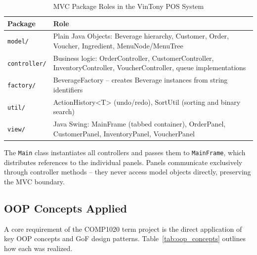 \documentclass[11pt,a4paper]{article}
\begin{document}
\begin{table}[H]
\centering
\caption{MVC Package Roles in the VinTony POS System}
\label{tab:mvc_packages}
\begin{tabular}{lp{10cm}}
\toprule
\textbf{Package} & \textbf{Role} \\
\midrule
\texttt{model/} & Plain Java Objects: Beverage hierarchy, Customer, Order, Voucher, Ingredient, MenuNode/MenuTree \\
\texttt{controller/} & Business logic: OrderController, CustomerController, InventoryController, VoucherController, queue implementations \\
\texttt{factory/} & BeverageFactory -- creates Beverage instances from string identifiers \\
\texttt{util/} & ActionHistory<T> (undo/redo), SortUtil (sorting and binary search) \\
\texttt{view/} & Java Swing: MainFrame (tabbed container), OrderPanel, CustomerPanel, InventoryPanel, VoucherPanel \\
\bottomrule
\end{tabular}
\end{table}

The \texttt{Main} class instantiates all controllers and passes them to \texttt{MainFrame}, which distributes references to the individual panels. Panels communicate exclusively through controller methods -- they never access model objects directly, preserving the MVC boundary.

\subsection{OOP Concepts Applied}
A core requirement of the COMP1020 term project is the direct application of key OOP concepts and GoF design patterns. Table~\ref{tab:oop_concepts} outlines how each was realized.
\end{document}

